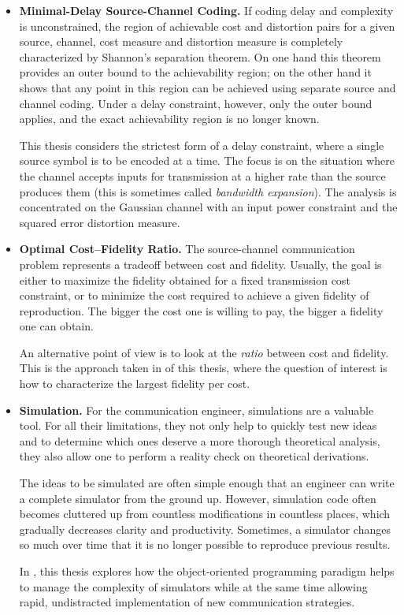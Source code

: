\begin{itemize}

  \item \textbf{Minimal-Delay Source-Channel Coding.} If coding delay and
    complexity is unconstrained, the region of achievable cost and distortion
    pairs for a given source, channel, cost measure and distortion measure is
    completely characterized by Shannon's separation theorem. On one hand this
    theorem provides an outer bound to the achievability region; on the other
    hand it shows that any point in this region can be achieved using separate
    source and channel coding. Under a delay constraint, however, only the outer
    bound applies, and the exact achievability region is no longer known. 

    This thesis considers the strictest form of a delay constraint, where a
    single source symbol is to be encoded at a time. The focus is
    on the situation where the channel accepts inputs for transmission at a
    higher rate than the source produces them (this is sometimes called
    \emph{bandwidth expansion}). The analysis is concentrated on the Gaussian
    channel with an input power constraint and the squared error distortion
    measure. 

  \item \textbf{Optimal Cost--Fidelity Ratio.} The source-channel communication
    problem represents a tradeoff between cost and fidelity. Usually, the goal
    is either to maximize the fidelity obtained for a fixed transmission cost
    constraint, or to minimize the cost required to achieve a given fidelity of
    reproduction. The bigger the cost one is willing to pay, the bigger a
    fidelity one can obtain. 

    An alternative point of view is to look at the \emph{ratio} between cost and
    fidelity. This is the approach taken in  of this thesis,
    where the question of interest is how to characterize the largest fidelity
    per cost.

  \item \textbf{Simulation.} For the communication engineer, simulations are a
    valuable tool. For all their limitations, they not only help to quickly test
    new ideas and to determine which ones deserve a more thorough theoretical
    analysis, they also allow one to perform a reality check on theoretical
    derivations.

    The ideas to be simulated are often simple enough that an engineer can write
    a complete simulator from the ground up. However, simulation code often
    becomes cluttered up from countless modifications in countless places, which
    gradually decreases clarity and productivity. Sometimes, a simulator changes
    so much over time that it is no longer possible to reproduce previous
    results.

    In , this thesis explores how the object-oriented
    programming paradigm helps to manage the complexity of simulators while at
    the same time allowing rapid, undistracted implementation of new
    communication strategies. 

\end{itemize}


